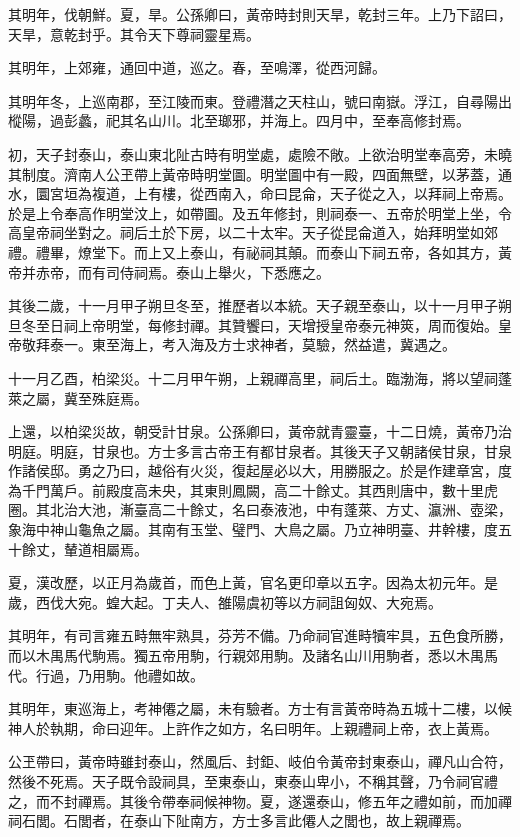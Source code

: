 其明年，伐朝鮮。夏，旱。公孫卿曰，黃帝時封則天旱，乾封三年。上乃下詔曰，天旱，意乾封乎。其令天下尊祠靈星焉。

其明年，上郊雍，通回中道，巡之。春，至鳴澤，從西河歸。

其明年冬，上巡南郡，至江陵而東。登禮潛之天柱山，號曰南嶽。浮江，自尋陽出樅陽，過彭蠡，祀其名山川。北至瑯邪，并海上。四月中，至奉高修封焉。

初，天子封泰山，泰山東北阯古時有明堂處，處險不敞。上欲治明堂奉高旁，未曉其制度。濟南人公玊帶上黃帝時明堂圖。明堂圖中有一殿，四面無壁，以茅蓋，通水，圜宮垣為複道，上有樓，從西南入，命曰昆侖，天子從之入，以拜祠上帝焉。於是上令奉高作明堂汶上，如帶圖。及五年修封，則祠泰一、五帝於明堂上坐，令高皇帝祠坐對之。祠后土於下房，以二十太牢。天子從昆侖道入，始拜明堂如郊禮。禮畢，燎堂下。而上又上泰山，有祕祠其顛。而泰山下祠五帝，各如其方，黃帝并赤帝，而有司侍祠焉。泰山上舉火，下悉應之。

其後二歲，十一月甲子朔旦冬至，推歷者以本統。天子親至泰山，以十一月甲子朔旦冬至日祠上帝明堂，每修封禪。其贊饗曰，天增授皇帝泰元神筴，周而復始。皇帝敬拜泰一。東至海上，考入海及方士求神者，莫驗，然益遣，冀遇之。

十一月乙酉，柏梁災。十二月甲午朔，上親禪高里，祠后土。臨渤海，將以望祠蓬萊之屬，冀至殊庭焉。

上還，以柏梁災故，朝受計甘泉。公孫卿曰，黃帝就青靈臺，十二日燒，黃帝乃治明庭。明庭，甘泉也。方士多言古帝王有都甘泉者。其後天子又朝諸侯甘泉，甘泉作諸侯邸。勇之乃曰，越俗有火災，復起屋必以大，用勝服之。於是作建章宮，度為千門萬戶。前殿度高未央，其東則鳳闕，高二十餘丈。其西則唐中，數十里虎圈。其北治大池，漸臺高二十餘丈，名曰泰液池，中有蓬萊、方丈、瀛洲、壺梁，象海中神山龜魚之屬。其南有玉堂、璧門、大鳥之屬。乃立神明臺、井幹樓，度五十餘丈，輦道相屬焉。

夏，漢改歷，以正月為歲首，而色上黃，官名更印章以五字。因為太初元年。是歲，西伐大宛。蝗大起。丁夫人、雒陽虞初等以方祠詛匈奴、大宛焉。

其明年，有司言雍五畤無牢熟具，芬芳不備。乃命祠官進畤犢牢具，五色食所勝，而以木禺馬代駒焉。獨五帝用駒，行親郊用駒。及諸名山川用駒者，悉以木禺馬代。行過，乃用駒。他禮如故。

其明年，東巡海上，考神僊之屬，未有驗者。方士有言黃帝時為五城十二樓，以候神人於執期，命曰迎年。上許作之如方，名曰明年。上親禮祠上帝，衣上黃焉。

公玊帶曰，黃帝時雖封泰山，然風后、封鉅、岐伯令黃帝封東泰山，禪凡山合符，然後不死焉。天子既令設祠具，至東泰山，東泰山卑小，不稱其聲，乃令祠官禮之，而不封禪焉。其後令帶奉祠候神物。夏，遂還泰山，修五年之禮如前，而加禪祠石閭。石閭者，在泰山下阯南方，方士多言此僊人之閭也，故上親禪焉。

